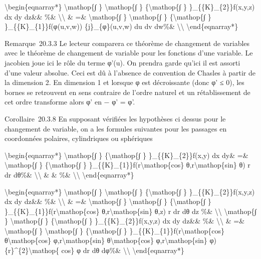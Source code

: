 \documentclass[]{article}
\begin{document}
\textbackslash{}begin\{eqnarray*\} \textbackslash{}mathop\{∫ \}
\textbackslash{}mathop\{∫ \} \{\textbackslash{}mathop\{∫ \}
\}\_\{\{K\}\_\{2\}\}f(x,y,z) dx dy dz\&\& \%\&
\textbackslash{}\textbackslash{} \& =\& \textbackslash{}mathop\{∫ \}
\textbackslash{}mathop\{∫ \} \{\textbackslash{}mathop\{∫ \}
\}\_\{\{K\}\_\{1\}\}f(φ(u,v,w)) \textbar{}\{j\}\_\{φ\}(u,v,w)\textbar{}
du dv dw\%\& \textbackslash{}\textbackslash{}
\textbackslash{}end\{eqnarray*\}

Remarque~20.3.3 Le lecteur comparera ce théorème de changement de
variables avec le théorème de changement de variable pour les fonctions
d'une variable. Le jacobien joue ici le rôle du terme φ'(u). On prendra
garde qu'ici il est assorti d'une valeur absolue. Ceci est dû à
l'absence de convention de Chasles à partir de la dimension 2. En
dimension 1 et lorsque φ est décroissante (donc φ' ≤ 0), les bornes se
retrouvent en sens contraire de l'ordre naturel et un rétablissement de
cet ordre transforme alors φ' en − φ' = \textbar{}φ'\textbar{}.

Corollaire~20.3.8 En supposant vérifiées les hypothèses ci dessus pour
le changement de variable, on a les formules suivantes pour les passages
en coordonnées polaires, cylindriques ou sphériques

\textbackslash{}begin\{eqnarray*\} \textbackslash{}mathop\{∫ \}
\{\textbackslash{}mathop\{∫ \} \}\_\{\{K\}\_\{2\}\}f(x,y) dx dy\& =\&
\textbackslash{}mathop\{∫ \} \{\textbackslash{}mathop\{∫ \}
\}\_\{\{K\}\_\{1\}\}f(r\textbackslash{}mathop\{cos\}
θ,r\textbackslash{}mathop\{sin\} θ) \textbar{}r\textbar{} dr dθ\%\&
\textbackslash{}\textbackslash{} \& \& \%\&
\textbackslash{}\textbackslash{} \textbackslash{}end\{eqnarray*\}

\textbackslash{}begin\{eqnarray*\} \textbackslash{}mathop\{∫ \}
\textbackslash{}mathop\{∫ \} \{\textbackslash{}mathop\{∫ \}
\}\_\{\{K\}\_\{2\}\}f(x,y,z) dx dy dz\&\& \%\&
\textbackslash{}\textbackslash{} \& =\& \textbackslash{}mathop\{∫ \}
\textbackslash{}mathop\{∫ \} \{\textbackslash{}mathop\{∫ \}
\}\_\{\{K\}\_\{1\}\}f(r\textbackslash{}mathop\{cos\}
θ,r\textbackslash{}mathop\{sin\} θ,z) \textbar{}r\textbar{} dr dθ dz
\%\& \textbackslash{}\textbackslash{} \textbackslash{}mathop\{∫ \}
\textbackslash{}mathop\{∫ \} \{\textbackslash{}mathop\{∫ \}
\}\_\{\{K\}\_\{2\}\}f(x,y,z) dx dy dz\&\& \%\&
\textbackslash{}\textbackslash{} \& =\& \textbackslash{}mathop\{∫ \}
\textbackslash{}mathop\{∫ \} \{\textbackslash{}mathop\{∫ \}
\}\_\{\{K\}\_\{1\}\}f(r\textbackslash{}mathop\{cos\}
θ\textbackslash{}mathop\{cos\} φ,r\textbackslash{}mathop\{sin\}
θ\textbackslash{}mathop\{cos\} φ,r\textbackslash{}mathop\{sin\} φ)
\textbar{}\{r\}\^{}\{2\}\textbackslash{}mathop\{ cos\} φ\textbar{} dr dθ
dφ\%\& \textbackslash{}\textbackslash{} \textbackslash{}end\{eqnarray*\}
\end{document}
